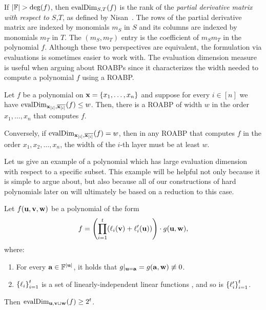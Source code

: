 \documentclass[11pt]{article}
\newcommand{\exi}{\vecx_{[i]}}
\begin{document}
If $|\F| > \deg(f)$, then $\operatorname{evalDim}_{S,T}(f)$ is the rank of the \emph{partial derivative matrix with respect to $S$,$T$}, as defined by Nisan~\cite{nis91}. The rows of the partial derivative matrix are indexed by monomials $m_S$ in $S$ and its columns are indexed by monomials $m_T$ in $T$. The $(m_S,m_T)$ entry is the coefficient of $m_S m_T$ in the polynomial $f$. 
Although these two perspectives are equivalent, the formulation via evaluations is sometimes easier to work with. The evaluation dimension measure is useful when arguing about ROABPs since it characterizes the width needed to compute a polynomial $f$ using a ROABP. 

\begin{theorem}
\label{thm:eval-dim-roabp}
  Let $f$ be a polynomial on $\mathbf{x} = \left\{ x_1,\ldots, x_n \right\}$ and suppose for every $i \in [n]$ we have $\evalDim_{\exi,\overline{\exi}}(f) \leq w$.
Then, there is a ROABP of width $w$ in the order $x_1,\ldots, x_n$ that computes $f$.

Conversely, if $\evalDim_{\exi,\overline{\exi}}(f) = w$, then in any ROABP that computes $f$ in the order $x_1, x_2, \ldots, x_n$, the width of the $i$-th layer must be at least $w$.
\end{theorem}

Let us give an example of a polynomial which has large evaluation dimension with respect to a specific subset. This example will be helpful not only because it is simple to argue about, but also because all of our constructions of hard polynomials later on will ultimately be based on a reduction to this case.

\begin{lemma}
\label{lem:large-evaldim}
Let $f(\mathbf{u}, \mathbf{v}, \mathbf{w})$ be a polynomial of the form
\[
f = \left( \prod_{i=1}^t (\ell_i(\mathbf{v}) + \ell'_i(\mathbf{u})) \right) \cdot g(\mathbf{u},\mathbf{w}),
\]
where:
\begin{enumerate}
\item For every $\veca \in \F^{|\vecu|}$, it holds that $g|_{\mathbf{u}=\mathbf{a}}=g(\mathbf{a},\mathbf{w}) \not \equiv 0$.
\item $\left\{ \ell_i \right\}_{i=1}^t$ is a set of linearly-independent linear functions , and so is $\left\{ \ell'_i \right\}_{i=1}^t$.
\end{enumerate}
Then $\operatorname{evalDim}_{\mathbf{u}, \mathbf{v} \sqcup \mathbf{w}} (f) \ge 2^{t}$.
\end{lemma}
\end{document}
